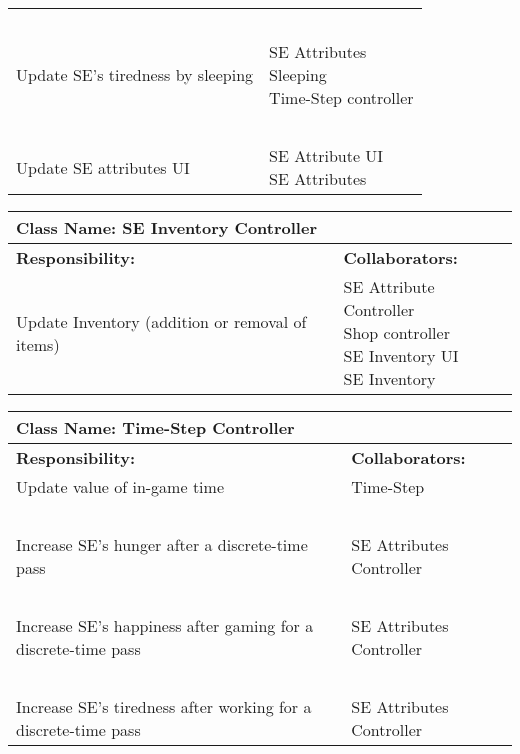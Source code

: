 \documentclass[]{article}
\begin{document}
\begin{table}[H]
\begin{tabular}{|p{7.5cm}|p{7.5cm}|}
        ~ & ~\\
        Update SE’s tiredness by sleeping & \makecell[l]{SE Attributes\\Sleeping\\Time-Step controller}\\
        ~ & ~\\
        Update SE attributes UI & \makecell[l]{SE Attribute UI\\SE Attributes}\\
        \hline
    \end{tabular}
\end{table}

\begin{table}[H]
    \centering
    \begin{tabular}{|p{7.5cm}|p{7.5cm}|}
        \hline
        \multicolumn{2}{|l|}{\textbf{Class Name:} SE Inventory Controller}\\
        \hline
        \textbf{Responsibility:} & \textbf{Collaborators:}\\
        \hline
        Update Inventory (addition or removal of items) & \makecell[l]{SE Attribute Controller\\Shop controller\\SE Inventory UI\\SE Inventory}\\
        \hline
    \end{tabular}
\end{table}

\begin{table}[H]
    \centering
    \begin{tabular}{|p{7.5cm}|p{7.5cm}|}
        \hline
        \multicolumn{2}{|l|}{\textbf{Class Name:} Time-Step Controller}\\
        \hline
        \textbf{Responsibility:} & \textbf{Collaborators:}\\
        \hline
        Update value of in-game time & Time-Step\\
        ~ & ~\\
        Increase SE’s hunger after a discrete-time pass & SE Attributes Controller\\
        ~ & ~\\
        Increase SE’s happiness after gaming for a discrete-time pass & SE Attributes Controller\\
        ~ & ~\\
        Increase SE’s tiredness after working for a discrete-time pass & SE Attributes Controller\\
        \hline
    \end{tabular}
\end{table}
\end{document}
